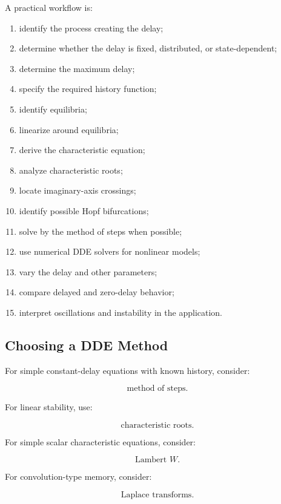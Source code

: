 A practical workflow is:

\begin{enumerate}
    \item identify the process creating the delay;
    \item determine whether the delay is fixed, distributed, or
          state-dependent;
    \item determine the maximum delay;
    \item specify the required history function;
    \item identify equilibria;
    \item linearize around equilibria;
    \item derive the characteristic equation;
    \item analyze characteristic roots;
    \item locate imaginary-axis crossings;
    \item identify possible Hopf bifurcations;
    \item solve by the method of steps when possible;
    \item use numerical DDE solvers for nonlinear models;
    \item vary the delay and other parameters;
    \item compare delayed and zero-delay behavior;
    \item interpret oscillations and instability in the application.
\end{enumerate}

\subsection{Choosing a DDE Method}
\label{subsec:choosing-dde-method}

For simple constant-delay equations with known history, consider:

\[
\boxed{
\text{method of steps}.
}
\]

For linear stability, use:

\[
\boxed{
\text{characteristic roots}.
}
\]

For simple scalar characteristic equations, consider:

\[
\boxed{
\text{Lambert }W.
}
\]

For convolution-type memory, consider:

\[
\boxed{
\text{Laplace transforms}.
}
\]

